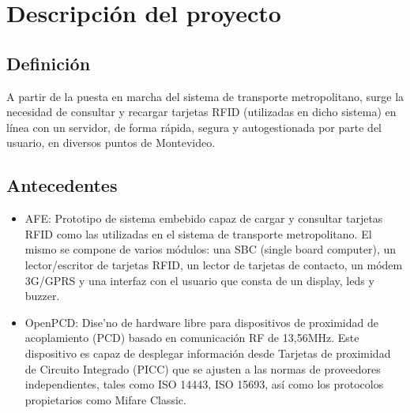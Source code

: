 \chapter{Descripci\'on del proyecto}

\section{Definici\'on}

A partir de la puesta en marcha del sistema de transporte metropolitano, surge la necesidad de consultar y recargar tarjetas RFID (utilizadas en dicho sistema) en l\'inea con un servidor, de forma r\'apida, segura y autogestionada por parte del usuario, en diversos puntos de Montevideo.

\section{Antecedentes}

\begin{itemize}

\item AFE: Prototipo de sistema embebido capaz de cargar y consultar tarjetas RFID como las utilizadas en el sistema de transporte metropolitano. El mismo se compone de varios m\'odulos: una SBC (single board computer), un lector/escritor de tarjetas RFID, un lector de tarjetas de contacto, un m\'odem 3G/GPRS y una interfaz con el usuario que consta de un display, leds y buzzer.

\item OpenPCD: Dise'no de hardware libre para dispositivos de proximidad de acoplamiento (PCD) basado en comunicaci\'on RF de 13,56MHz. Este dispositivo es capaz de desplegar informaci\'on desde Tarjetas de proximidad de Circuito Integrado (PICC) que se ajusten a las normas de proveedores independientes, tales como ISO 14443, ISO 15693, as\'i como los protocolos propietarios como Mifare Classic.

\end{itemize}